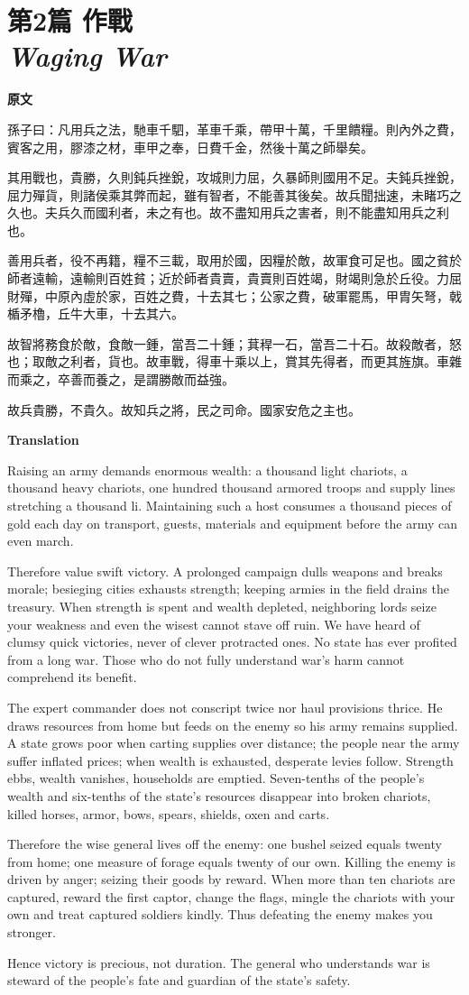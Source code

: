 \documentclass[12pt]{book}
\newcommand{\chapterentry}[4]{%
  \chapter[\texorpdfstring{#1}{#1}]{\texorpdfstring{#1\\\Large\textit{#2}}{#1 — #2}}%
  \noindent\textbf{原文}\par
  #3

  \bigskip
  \noindent\textbf{Translation}\par
  #4
}
\begin{document}
\chapterentry{第2篇 作戰}{Waging War}{%
孫子曰：凡用兵之法，馳車千駟，革車千乘，帶甲十萬，千里饋糧。則內外之費，賓客之用，膠漆之材，車甲之奉，日費千金，然後十萬之師舉矣。

其用戰也，貴勝，久則鈍兵挫銳，攻城則力屈，久暴師則國用不足。夫鈍兵挫銳，屈力殫貨，則諸侯乘其弊而起，雖有智者，不能善其後矣。故兵聞拙速，未睹巧之久也。夫兵久而國利者，未之有也。故不盡知用兵之害者，則不能盡知用兵之利也。

善用兵者，役不再籍，糧不三載，取用於國，因糧於敵，故軍食可足也。國之貧於師者遠輸，遠輸則百姓貧；近於師者貴賣，貴賣則百姓竭，財竭則急於丘役。力屈財殫，中原內虛於家，百姓之費，十去其七；公家之費，破軍罷馬，甲胄矢弩，戟楯矛櫓，丘牛大車，十去其六。

故智將務食於敵，食敵一鍾，當吾二十鍾；萁稈一石，當吾二十石。故殺敵者，怒也；取敵之利者，貨也。故車戰，得車十乘以上，賞其先得者，而更其旌旗。車雜而乘之，卒善而養之，是謂勝敵而益強。

故兵貴勝，不貴久。故知兵之將，民之司命。國家安危之主也。}{%
Raising an army demands enormous wealth: a thousand light chariots, a thousand heavy chariots, one hundred thousand armored troops and supply lines stretching a thousand li. Maintaining such a host consumes a thousand pieces of gold each day on transport, guests, materials and equipment before the army can even march.

Therefore value swift victory. A prolonged campaign dulls weapons and breaks morale; besieging cities exhausts strength; keeping armies in the field drains the treasury. When strength is spent and wealth depleted, neighboring lords seize your weakness and even the wisest cannot stave off ruin. We have heard of clumsy quick victories, never of clever protracted ones. No state has ever profited from a long war. Those who do not fully understand war’s harm cannot comprehend its benefit.

The expert commander does not conscript twice nor haul provisions thrice. He draws resources from home but feeds on the enemy so his army remains supplied. A state grows poor when carting supplies over distance; the people near the army suffer inflated prices; when wealth is exhausted, desperate levies follow. Strength ebbs, wealth vanishes, households are emptied. Seven-tenths of the people’s wealth and six-tenths of the state’s resources disappear into broken chariots, killed horses, armor, bows, spears, shields, oxen and carts.

Therefore the wise general lives off the enemy: one bushel seized equals twenty from home; one measure of forage equals twenty of our own. Killing the enemy is driven by anger; seizing their goods by reward. When more than ten chariots are captured, reward the first captor, change the flags, mingle the chariots with your own and treat captured soldiers kindly. Thus defeating the enemy makes you stronger.

Hence victory is precious, not duration. The general who understands war is steward of the people’s fate and guardian of the state’s safety.}
\end{document}
